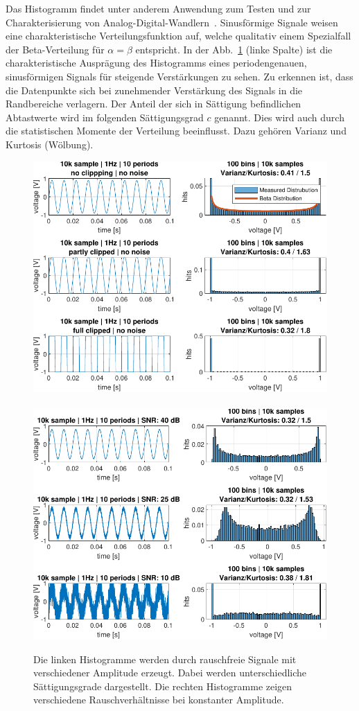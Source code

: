 Das Histogramm findet unter anderem Anwendung zum Testen und zur Charakterisierung von Analog-Digital-Wandlern~\cite{Gamad-2009}. Sinusförmige Signale weisen eine charakteristische Verteilungsfunktion auf, welche qualitativ einem Spezialfall der Beta-Verteilung für $\alpha = \beta$ entspricht. In der Abb.~\ref{fig:Histogramm-Gain} (linke Spalte) ist die charakteristische Ausprägung des Histogramms eines periodengenauen, sinusförmigen Signals für steigende Verstärkungen zu sehen. Zu erkennen ist, dass die Datenpunkte sich bei zunehmender Verstärkung des Signals in die Randbereiche verlagern. Der Anteil der sich in Sättigung befindlichen Abtastwerte wird im folgenden Sättigungsgrad $c$ genannt. Dies wird auch durch die statistischen Momente der Verteilung beeinflusst. Dazu gehören Varianz und Kurtosis (Wölbung).
\begin{figure}[h!] 
	\hspace*{-2mm}
	\centering 
	\includegraphics[width=1.05\columnwidth]{../img/beta-distribution.pdf}~~~~~
	\includegraphics[width=1.05\columnwidth]{../img/noise-histogramm.pdf}
	\caption{Die linken Histogramme werden durch rauschfreie Signale mit verschiedener Amplitude erzeugt. Dabei werden unterschiedliche Sättigungsgrade dargestellt. Die rechten Histogramme zeigen verschiedene Rauschverhältnisse bei konstanter Amplitude.}
	\label{fig:Histogramm-Gain}
\end{figure} 
